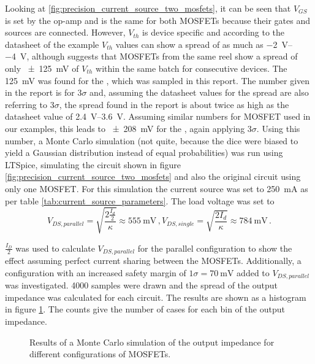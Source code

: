 Looking at \ref{fig:precision_current_source_two_mosfets}, it can be seen that $V_{GS}$ is set by the op-amp and is the same for both MOSFETs because their gates and sources are connected. However, $V_{th}$ is device specific and according to the datasheet of the example  \cite{datasheet_IRF9610} $V_{th}$ values can show a spread of as much as \qtyrange[range-units = single, range-phrase={~to~}]{-2}{-4}{\V}, although \cite{appnote_mosfet_parameter_spread} suggests that MOSFETs from the same reel show a spread of only \qty{\pm 125}{\mV} of $V_{th}$  within the same batch for consecutive devices. The \qty{125}{\mV} was found for the  \cite{datasheet_BUK7S1R5}, which was sampled in this report. The number given in the report is for $3\sigma$ and, assuming the datasheet values for the spread are also referring to $3\sigma$, the spread found in the report is about twice as high as the datasheet value of \qtyrange[range-units = single]{2.4}{3.6}{\V}. Assuming similar numbers for  MOSFET used in our examples, this leads to \qty{\pm 208}{\mV} for the , again applying $3\sigma$. Using this number, a Monte Carlo simulation (not quite, because the dice were biased to yield a Gaussian distribution instead of equal probabilities) was run using LTSpice, simulating the circuit shown in figure \ref{fig:precision_current_source_two_mosfets} and also the original circuit using only one MOSFET. For this simulation the current source was set to \qty{250}{\mA} as per table \ref{tab:current_source_parameters}. The load voltage was set to
\begin{equation*}
    V_{DS, parallel} = \sqrt{\frac{2 \frac{I_d}{2}}{\kappa}} \approx \qty{555}{\mV}\,,
    V_{DS, single} = \sqrt{\frac{2 I_d}{\kappa}} \approx \qty{784}{\mV} \,.
\end{equation*}

$\frac{I_D}{2}$ was used to calculate $V_{DS, parallel}$ for the parallel configuration to show the effect assuming perfect current sharing between the MOSFETs. Additionally, a configuration with an increased safety margin of $1 \sigma = \qty{70}{\mV}$ added to $V_{DS, parallel}$ was investigated. \num{4000} samples were drawn and the spread of the output impedance was calculated for each circuit. The results are shown as a histogram in figure \ref{fig:ltpsice_mosfet_mc_output_impedance}. The counts give the number of cases for each bin of the output impedance.
\begin{figure}[ht]
    \centering
    \caption{Results of a Monte Carlo simulation of the output impedance for different configurations of MOSFETs.}
    \label{fig:ltpsice_mosfet_mc_output_impedance}
\end{figure}

